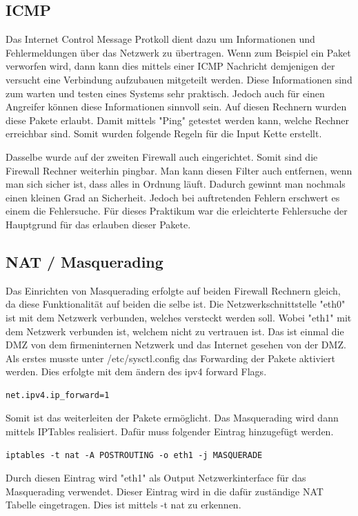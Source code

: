 \subsection{ICMP}
Das Internet Control Message Protkoll dient dazu um Informationen und Fehlermeldungen über das Netzwerk zu übertragen. Wenn zum Beispiel ein Paket verworfen wird, dann kann dies mittels einer ICMP Nachricht demjenigen der versucht eine Verbindung aufzubauen mitgeteilt werden. Diese Informationen sind zum warten und testen eines Systems sehr praktisch. Jedoch auch für einen Angreifer können diese Informationen sinnvoll sein. Auf diesen Rechnern wurden diese Pakete erlaubt. Damit mittels "Ping" getestet werden kann, welche Rechner erreichbar sind. Somit wurden folgende Regeln für die Input Kette erstellt.

Dasselbe wurde auf der zweiten Firewall auch eingerichtet. Somit sind die Firewall Rechner weiterhin pingbar. Man kann diesen Filter auch entfernen, wenn man sich sicher ist, dass alles in Ordnung läuft. Dadurch gewinnt man nochmals einen kleinen Grad an Sicherheit. Jedoch bei auftretenden Fehlern erschwert es einem die Fehlersuche. Für dieses Praktikum war die erleichterte Fehlersuche der Hauptgrund für das erlauben dieser Pakete.

\subsection{NAT / Masquerading}
Das Einrichten von Masquerading erfolgte auf beiden Firewall Rechnern gleich, da diese Funktionalität auf beiden die selbe ist. Die Netzwerkschnittstelle "eth0" ist mit dem Netzwerk verbunden, welches versteckt werden soll. Wobei "eth1" mit dem Netzwerk verbunden ist, welchem nicht zu vertrauen ist. Das ist einmal die DMZ von dem firmeninternen Netzwerk und das Internet gesehen von der DMZ. \\
Als erstes musste unter /etc/sysctl.config das Forwarding der Pakete aktiviert werden. Dies erfolgte mit dem ändern des ipv4 forward Flags.
\begin{lstlisting}[caption={/etc/sysctl.config}]
net.ipv4.ip_forward=1
\end{lstlisting}
Somit ist das weiterleiten der Pakete ermöglicht. Das Masquerading wird dann mittels IPTables realisiert. Dafür muss folgender Eintrag hinzugefügt werden.
\begin{lstlisting}
iptables -t nat -A POSTROUTING -o eth1 -j MASQUERADE
\end{lstlisting}
Durch diesen Eintrag wird "eth1" als Output Netzwerkinterface für das Masquerading verwendet. Dieser Eintrag wird in die dafür zuständige NAT Tabelle eingetragen. Dies ist mittels -t nat zu erkennen.

